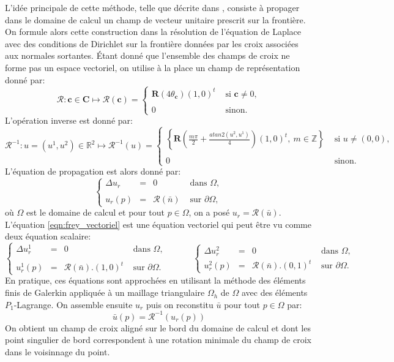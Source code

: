 L'idée principale de cette méthode, telle que décrite dans \cite{kowalski2013pde}, consiste à propager dans le domaine de calcul un champ de vecteur unitaire prescrit sur la frontière. On formule alors cette construction dans la résolution de l'équation de Laplace avec des conditions de Dirichlet sur la frontière données par les croix associées aux normales sortantes. Étant donné que l'ensemble des champs de croix ne forme pas un espace vectoriel, on utilise à la place un champ de représentation donné par:
$$
\mathcal{R}: \mathbf{c}\in\mathbf{C}\mapsto\mathcal{R}(\mathbf{c})=
\left\{
\begin{array}{ll}
\mathbf{R}(4\theta_{\mathbf{c}})(1, 0)^t& \mbox{ si }\mathbf{c}\neq 0,\\\\
0&\mbox{ sinon}.
\end{array}
\right.
$$
L'opération inverse est donné par:
$$
\mathcal{R}^{-1}: u=(u^1, u^2)\in\mathbb{R}^2\mapsto\mathcal{R}^{-1}(u)=
\left\{
\begin{array}{ll}
\displaystyle\left\{\mathbf{R}\left(\frac{m\pi}{2}+\frac{atan2(u^2, u^1)}{4}\right)(1, 0)^t,~ m\in \mathbb{Z}\right\} &\mbox{ si }u\neq (0,0),\\\\
0&\mbox{ sinon}.
\end{array}
\right.
$$
L'équation de propagation est alors donné par:
\begin{equation}
\left\{
\begin{array}{lcll}
\Delta u_r &=& 0 &\mbox{ dans }\Omega,\\\\
u_r(p)&=&\mathcal{R}(\bar{n}) & \mbox{ sur } \partial\Omega,
\end{array}
\right.
\label{eqn:frey_vectoriel}
\end{equation}
où $\Omega$ est le domaine de calcul et pour tout $p\in\Omega$, on a posé $u_r=\mathcal{R}(\bar{u})$. L'équation \eqref{eqn:frey_vectoriel} est une équation vectoriel qui peut être vu comme deux équation scalaire:
$$
\left\{
\begin{array}{lcll}
\Delta u_r^1 &=& 0 &\mbox{ dans }\Omega,\\\\
u_r^1(p)&=&\mathcal{R}(\bar{n}).(1, 0)^t & \mbox{ sur } \partial\Omega.
\end{array}
\right.
\quad\quad\quad
\left\{
\begin{array}{lcll}
\Delta u_r^2 &=& 0 &\mbox{ dans }\Omega,\\[0.5cm]
u_r^2(p)&=&\mathcal{R}(\bar{n}).(0, 1)^t & \mbox{ sur } \partial\Omega.
\end{array}
\right.
$$
En pratique, ces équations sont approchées en utilisant la méthode des éléments finis de Galerkin appliquée à un maillage triangulaire $\Omega_h$ de $\Omega$ avec des éléments $P_1$-Lagrange. On assemble ensuite $u_r$ puis on reconstitu $\bar{u}$ pour tout $p\in\Omega$ par:
$$
\bar{u}(p)=\mathcal{R}^{-1}(u_r(p))
$$
On obtient un champ de croix aligné sur le bord du domaine de calcul et dont les point singulier de bord correspondent à une rotation minimale du champ de croix dans le voisinnage du point.


